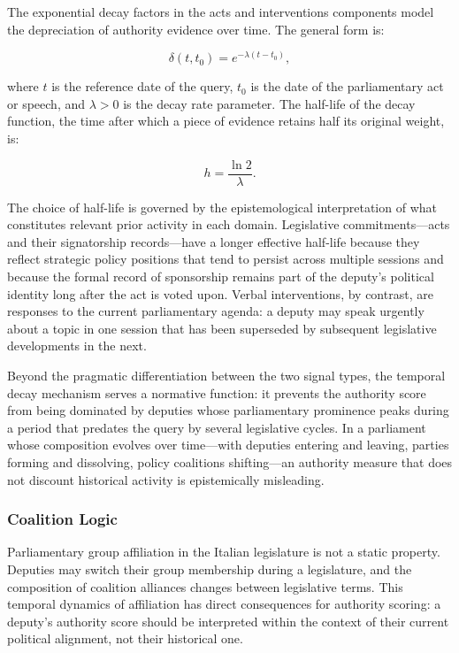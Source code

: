 The exponential decay factors in the acts and interventions components model the depreciation
of authority evidence over time. The general form is:

\begin{equation}
    \delta(t, t_0) = e^{-\lambda (t - t_0)},
\end{equation}

where $t$ is the reference date of the query, $t_0$ is the date of the parliamentary act or
speech, and $\lambda > 0$ is the decay rate parameter. The half-life of the decay function,
the time after which a piece of evidence retains half its original weight, is:

\begin{equation}
    h = \frac{\ln 2}{\lambda}.
\end{equation}

The choice of half-life is governed by the epistemological interpretation of what constitutes
relevant prior activity in each domain. Legislative commitments---acts and their signatorship
records---have a longer effective half-life because they reflect strategic policy positions
that tend to persist across multiple sessions and because the formal record of sponsorship
remains part of the deputy's political identity long after the act is voted upon. Verbal
interventions, by contrast, are responses to the current parliamentary agenda: a deputy may
speak urgently about a topic in one session that has been superseded by subsequent legislative
developments in the next.

Beyond the pragmatic differentiation between the two signal types, the temporal decay mechanism
serves a normative function: it prevents the authority score from being dominated by deputies
whose parliamentary prominence peaks during a period that predates the query by several
legislative cycles. In a parliament whose composition evolves over time---with deputies entering
and leaving, parties forming and dissolving, policy coalitions shifting---an authority measure
that does not discount historical activity is epistemically misleading.

\subsubsection{Coalition Logic}

Parliamentary group affiliation in the Italian legislature is not a static property. Deputies
may switch their group membership during a legislature, and the composition of coalition
alliances changes between legislative terms. This temporal dynamics of affiliation has direct
consequences for authority scoring: a deputy's authority score should be interpreted within the
context of their current political alignment, not their historical one.

